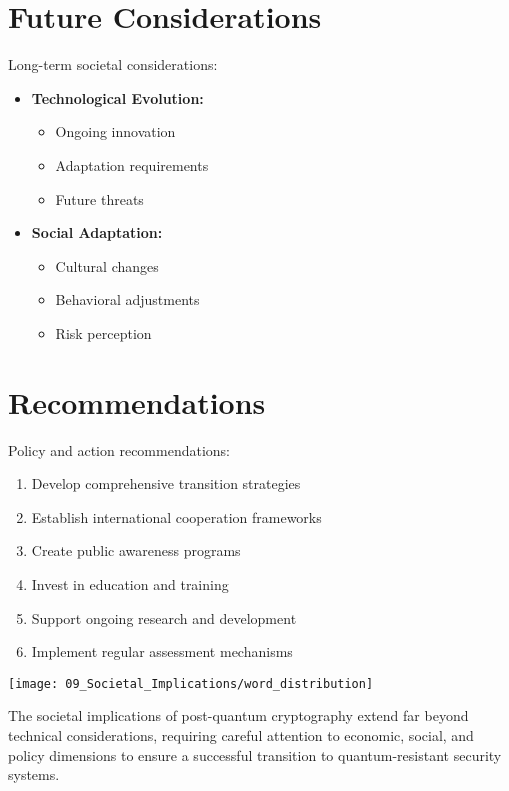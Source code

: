 \section{Future Considerations}\label{sec:future}

Long-term societal considerations:

\begin{itemize}
    \item \textbf{Technological Evolution:}
    \begin{itemize}
        \item Ongoing innovation
        \item Adaptation requirements
        \item Future threats
    \end{itemize}
    \item \textbf{Social Adaptation:}
    \begin{itemize}
        \item Cultural changes
        \item Behavioral adjustments
        \item Risk perception
    \end{itemize}
\end{itemize}

\section{Recommendations}\label{sec:recommendations}

Policy and action recommendations:

\begin{enumerate}
    \item Develop comprehensive transition strategies
    \item Establish international cooperation frameworks
    \item Create public awareness programs
    \item Invest in education and training
    \item Support ongoing research and development
    \item Implement regular assessment mechanisms
\end{enumerate}

\texttt{[image: 09\_Societal\_Implications/word\_distribution]}

The societal implications of post-quantum cryptography extend far beyond technical considerations, requiring careful attention to economic, social, and policy dimensions to ensure a successful transition to quantum-resistant security systems.